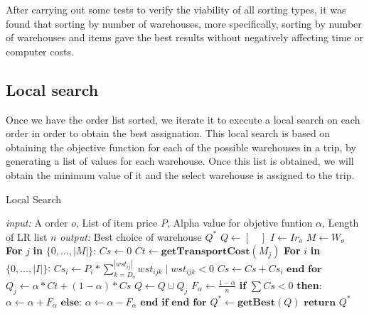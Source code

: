 \documentclass[letterpaper]{article} %
\begin{document}
After carrying out some tests to verify the viability of all sorting types, it was found that sorting by number of warehouses, more specifically, sorting by number of warehouses and items gave the best results without negatively affecting time or computer costs.

\subsection*{Local search}

Once we have the order list sorted, we iterate it to execute a local search on each order in order to obtain the best assignation. This local search is based on obtaining the objective function for each of the possible warehouses in a trip, by generating a list of values for each warehouse. Once this list is obtained, we will obtain the minimum value of it and the select warehouse is assigned to the trip.

\begin{algorithm}[H] \label{code:LocalSearch}
    \caption{Local Search}
    \begin{algorithmic}[1]
        \STATE \textit{input: } A order $o$, List of item price $P$, Alpha value for objetive funtion $\alpha$, Length of LR list $n$
        \STATE \textit{output: }  Best choice of warehouse $Q^*$
        \STATE  $Q \longleftarrow [\quad]$
        \STATE  $I \longleftarrow Ir_{o}$
        \STATE  $M \longleftarrow W_{o}$
        \STATE  \textbf{For} $j$ \textbf{in} $\{ 0,\dots,|M|\}$:
        \STATE  \quad $Cs \longleftarrow 0$
        \STATE  \quad $Ct \longleftarrow \textbf{getTransportCost}(M_j) $ \label{eq:ct}
        \STATE  \quad \textbf{For} $i$ \textbf{in} $\{ 0,\dots,|I|\}$:
        \STATE  \quad \quad $Cs_i \longleftarrow P_i * \sum_{k=D_{o}}^{|wst_{ij}|} wst_{ijk}\; |\; wst_{ijk} < 0 $ \label{eq:cs}
        \STATE  \quad \quad $Cs \longleftarrow Cs + Cs_i$
        \STATE  \quad  $\textbf{end for}$
        \STATE  \quad $Q_j \longleftarrow \alpha * Ct + (1 - \alpha) * Cs$ \label{eq:fitness}
        \STATE  \quad $Q \longleftarrow Q \cup Q_j$ \label{eq:fitness}
        \STATE  \quad $F_{\alpha}  \longleftarrow \frac{1-\alpha}{n}$ \label{eq:fitness}
        \STATE  \quad \textbf{if} $\sum Cs < 0$ \textbf{then}:
        \STATE  \quad \quad $\alpha \longleftarrow \alpha + F_{\alpha}$
        \STATE  \quad $\textbf{else:}$
        \STATE  \quad \quad $\alpha \longleftarrow \alpha - F_{\alpha}$
        \STATE  \quad $\textbf{end if}$
        \STATE  $\textbf{end for}$
         \STATE  $Q^* \longleftarrow \textbf{getBest}(Q)$
        \STATE  $\textbf{return } Q^*$
    \end{algorithmic}
\end{algorithm}
\end{document}
